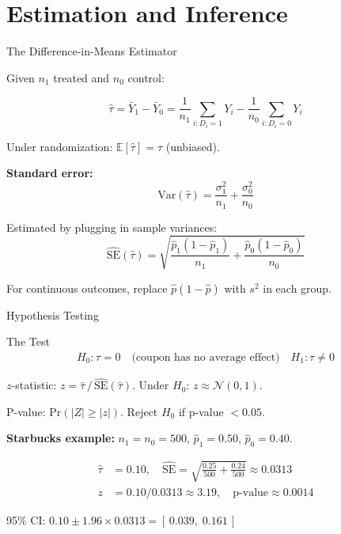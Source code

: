\documentclass[aspectratio=169, 11pt, handout]{beamer}
\newcommand{\E}{\mathbb{E}}
\newcommand{\Var}{\mathrm{Var}}
\newcommand{\SE}{\mathrm{SE}}
\newcommand{\Prob}{\mathrm{Pr}}
\begin{document}
\section{Estimation and Inference}

\begin{frame}{The Difference-in-Means Estimator}

Given $n_1$ treated and $n_0$ control:

\[
\hat{\tau} = \bar{Y}_1 - \bar{Y}_0 = \frac{1}{n_1}\sum_{i: D_i = 1} Y_i - \frac{1}{n_0}\sum_{i: D_i = 0} Y_i
\]

\bigskip

Under randomization: $\E[\hat{\tau}] = \tau$ (unbiased).

\bigskip
\pause

\textbf{Standard error:}
\[
\Var(\hat{\tau}) = \frac{\sigma_1^2}{n_1} + \frac{\sigma_0^2}{n_0}
\]

Estimated by plugging in sample variances:
\[
\widehat{\SE}(\hat{\tau}) = \sqrt{\frac{\hat{p}_1(1-\hat{p}_1)}{n_1} + \frac{\hat{p}_0(1-\hat{p}_0)}{n_0}}
\]

For continuous outcomes, replace $\hat{p}(1-\hat{p})$ with $s^2$ in each group.
\end{frame}

\begin{frame}{Hypothesis Testing}

\begin{block}{The Test}
\vspace{-0.5em}
\begin{align*}
H_0 : \tau = 0 \quad \text{(coupon has no average effect)} \quad H_1 : \tau \neq 0
\end{align*}
\vspace{-1em}

$z$-statistic: $z = \hat{\tau} \,/\, \widehat{\SE}(\hat{\tau})$. Under $H_0$: $z \approx \mathcal{N}(0,1)$.

\medskip

P-value: $\Prob(|Z| \geq |z|)$. Reject $H_0$ if p-value $< 0.05$.
\end{block}

\pause
\medskip

\textbf{Starbucks example:} $n_1 = n_0 = 500$, $\hat{p}_1 = 0.50$, $\hat{p}_0 = 0.40$.

\begin{align*}
\hat{\tau} &= 0.10, \quad \widehat{\SE} = \sqrt{\frac{0.25}{500} + \frac{0.24}{500}} \approx 0.0313 \\[0.3em]
z &= 0.10 / 0.0313 \approx 3.19, \quad \text{p-value} \approx 0.0014
\end{align*}

95\% CI: $0.10 \pm 1.96 \times 0.0313 = [\,0.039, \; 0.161\,]$
\end{frame}
\end{document}
